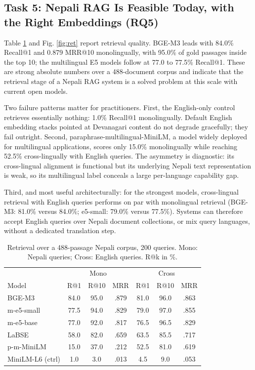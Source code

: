 \documentclass[conference]{IEEEtran}
\begin{document}
\subsection{Task 5: Nepali RAG Is Feasible Today, with the Right Embeddings (RQ5)}
Table \ref{tab:ret} and Fig. \ref{fig:ret} report retrieval quality. BGE-M3 leads with 84.0\% Recall@1 and 0.879 MRR@10 monolingually, with 95.0\% of gold passages inside the top 10; the multilingual E5 models follow at 77.0 to 77.5\% Recall@1. These are strong absolute numbers over a 488-document corpus and indicate that the retrieval stage of a Nepali RAG system is a solved problem at this scale with current open models.

Two failure patterns matter for practitioners. First, the English-only control retrieves essentially nothing: 1.0\% Recall@1 monolingually. Default English embedding stacks pointed at Devanagari content do not degrade gracefully; they fail outright. Second, paraphrase-multilingual-MiniLM, a model widely deployed for multilingual applications, scores only 15.0\% monolingually while reaching 52.5\% cross-lingually with English queries. The asymmetry is diagnostic: its cross-lingual alignment is functional but its underlying Nepali text representation is weak, so its multilingual label conceals a large per-language capability gap.

Third, and most useful architecturally: for the strongest models, cross-lingual retrieval with English queries performs on par with monolingual retrieval (BGE-M3: 81.0\% versus 84.0\%; e5-small: 79.0\% versus 77.5\%). Systems can therefore accept English queries over Nepali document collections, or mix query languages, without a dedicated translation step.

\begin{table}[t]
\caption{Retrieval over a 488-passage Nepali corpus, 200 queries. Mono: Nepali queries; Cross: English queries. R@k in \%.}
\label{tab:ret}
\centering
\small
\begin{tabular}{lcccccc}
\toprule
 & \multicolumn{3}{c}{Mono} & \multicolumn{3}{c}{Cross} \\
Model & R@1 & R@10 & MRR & R@1 & R@10 & MRR \\
\midrule
BGE-M3 & 84.0 & 95.0 & .879 & 81.0 & 96.0 & .863 \\
m-e5-small & 77.5 & 94.0 & .829 & 79.0 & 97.0 & .855 \\
m-e5-base & 77.0 & 92.0 & .817 & 76.5 & 96.5 & .829 \\
LaBSE & 58.0 & 82.0 & .659 & 63.5 & 85.5 & .717 \\
p-m-MiniLM & 15.0 & 37.0 & .212 & 52.5 & 81.0 & .619 \\
MiniLM-L6 (ctrl) & 1.0 & 3.0 & .013 & 4.5 & 9.0 & .053 \\
\bottomrule
\end{tabular}
\end{table}
\end{document}
